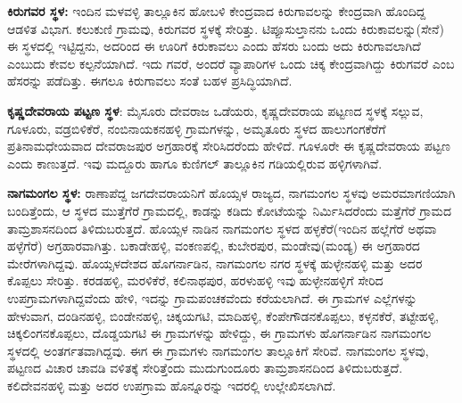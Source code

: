 \textbf{ಕಿರುಗವರ ಸ್ಥಳ:} ಇಂದಿನ ಮಳವಳ್ಳಿ ತಾಲ್ಲೂಕಿನ ಹೋಬಳಿ ಕೇಂದ್ರವಾದ ಕಿರುಗಾವಲನ್ನು ಕೇಂದ್ರವಾಗಿ ಹೊಂದಿದ್ದ ಆಡಳಿತ ವಿಭಾಗ. ಕಲುಕುಣಿ ಗ್ರಾಮವು, ಕಿರುಗವರ ಸ್ಥಳಕ್ಕೆ ಸೇರಿತ್ತು. ಟಿಪ್ಪೂಸುಲ್ತಾನನು ಒಂದು ಕಿರುಕಾವಲನ್ನು(ಸೇನೆ) ಈ ಸ್ಥಳದಲ್ಲಿ ಇಟ್ಟಿದ್ದನು, ಅದರಿಂದ ಈ ಊರಿಗೆ ಕಿರುಕಾವಲು ಎಂದು ಹೆಸರು ಬಂದು ಅದು ಕಿರುಗಾವಲಾಗಿದೆ ಎಂಬುದು ಕೇವಲ ಕಲ್ಪನೆಯಾಗಿದೆ. ಇದು ಗವರೆ, ಅಂದರೆ ವ್ಯಾಪಾರಿಗಳ ಒಂದು ಚಿಕ್ಕ ಕೇಂದ್ರವಾಗಿದ್ದು ಕಿರುಗವರೆ ಎಂಬ ಹೆಸರನ್ನು ಪಡೆದಿತ್ತು. ಈಗಲೂ ಕಿರುಗಾವಲು ಸಂತೆ ಬಹಳ ಪ್ರಸಿದ್ಧಿಯಾಗಿದೆ.

\textbf{ಕೃಷ್ಣದೇವರಾಯ ಪಟ್ಟಣ ಸ್ಥಳ}: ಮೈಸೂರು ದೇವರಾಜ ಒಡೆಯರು, ಕೃಷ್ಣದೇವರಾಯ ಪಟ್ಟಣದ ಸ್ಥಳಕ್ಕೆ ಸಲ್ಲುವ, ಗೂಳೂರು, ವಡ್ರಬಿಳಿಕೆರೆ, ನಂಬಿನಾಯಕನಹಳ್ಳಿ ಗ್ರಾಮಗಳನ್ನು, ಅಮೃತೂರು ಸ್ಥಳದ ಹಾಲುಗಂಗಕೆರೆಗೆ ಪ್ರತಿನಾಮಧೇಯವಾದ ದೇವರಾಜಪುರ ಅಗ್ರಹಾರಕ್ಕೆ ಸೇರಿಸಿದರೆಂದು ಹೇಳಿದೆ. ಗೂಳೂರೇ ಈ ಕೃಷ್ಣದೇವರಾಯ ಪಟ್ಟಣ ಎಂದು ಕಾಣುತ್ತದೆ. ಇವು ಮದ್ದೂರು ಹಾಗೂ ಕುಣಿಗಲ್​ ತಾಲ್ಲೂಕಿನ ಗಡಿಯಲ್ಲಿರುವ ಹಳ್ಳಿಗಳಾಗಿವೆ.

\textbf{ನಾಗಮಂಗಲ ಸ್ಥಳ:} ರಾಣಾಪೆದ್ದ ಜಗದೇವರಾಯನಿಗೆ ಹೊಯ್ಸಳ ರಾಜ್ಯದ, ನಾಗಮಂಗಲ ಸ್ಥಳವು ಅಮರಮಾಗಣಿ\-ಯಾಗಿ ಬಂದಿತ್ತೆಂದು, ಆ ಸ್ಥಳದ ಮುತ್ತೆಗೆರೆ ಗ್ರಾಮದಲ್ಲಿ, ಕಾಡನ್ನು ಕಡಿದು ಕೋಟೆಯನ್ನು ನಿರ್ಮಿಸಿದರೆಂದು ಮತ್ತೆಗೆರೆ ಗ್ರಾಮದ ತಾಮ್ರಶಾಸನದಿಂದ ತಿಳಿದುಬರುತ್ತದೆ. ಹೊಯ್ಸಳ ನಾಡಿನ ನಾಗಮಂಗಲ ಸ್ಥಳದ ಹಳ್ಳಕೆರೆ(ಇಂದಿನ ಹಲ್ಲೆಗೆರೆ ಅಥವಾ ಹಳ್ಳೆಗೆರೆ) ಅಗ್ರಹಾರವಾಗಿತ್ತು. ಬಕಾಡೇಹಳ್ಳಿ, ವಂಕಣಪಲ್ಲಿ, ಕುಬೇರಪುರ, ಮಂಡೇವು(ಮಂಡ್ಯ) ಈ ಅಗ್ರಹಾರದ ಮೇರೆಗಳಾಗಿದ್ದವು. ಹೊಯ್ಸಳದೇಶದ ಹೊಗರ್ನಾಡಿನ, ನಾಗಮಂಗಲ ನಗರ ಸ್ಥಳಕ್ಕೆ ಹುಳ್ಳೇನಹಳ್ಳಿ ಮತ್ತು ಅದರ ಕೊಪ್ಪಲು ಸೇರಿತ್ತು. ಕರಡಹಳ್ಳಿ, ಮರಳಿಕೆರೆ, ಕಲಿನಾಥಪುರ, ಹರಳುಹಳ್ಳಿ ಇವು ಹುಳ್ಳೇನಹಳ್ಳಿಗೆ ಸೇರಿದ ಉಪಗ್ರಾಮಗಳಾಗಿದ್ದವೆಂದು ಹೇಳಿ, ಇದನ್ನು ಗ್ರಾಮಪಂಚಕವೆಂದು ಕರೆಯಲಾಗಿದೆ. ಈ ಗ್ರಾಮಗಳ ಎಲ್ಲೆಗಳನ್ನು ಹೇಳುವಾಗ, ದಂಡಿನಹಳ್ಳಿ, ಬಿಂಡೇನಹಳ್ಳಿ, ಚಿಕ್ಕಯಗಟಿ, ಮಾದಿಹಳ್ಳಿ, ಕೆಂಪೇಗೌಡನಕೊಪ್ಪಲು, ಕಳ್ಳನಕೆರೆ, ತಟ್ಟೇಹಳ್ಳಿ, ಚಿಕ್ಕಲಿಂಗನಕೊಪ್ಪಲು, ದೊಡ್ಡಯಗಟಿ ಈ ಗ್ರಾಮಗಳನ್ನು ಹೇಳಿದ್ದು, ಈ ಗ್ರಾಮಗಳು ಹೊಗರ್ನಾಡಿನ ನಾಗಮಂಗಲ ಸ್ಥಳದಲ್ಲಿ ಅಂತರ್ಗತವಾಗಿದ್ದವು. ಈಗ ಈ ಗ್ರಾಮಗಳು ನಾಗಮಂಗಲ ತಾಲ್ಲೂಕಿಗೆ ಸೇರಿವೆ. ನಾಗಮಂಗಲ ಸ್ಥಳವು, ಪಟ್ಟಣದ ವಿಚಾರ ಚಾವಡಿ ವಳಿತಕ್ಕೆ ಸೇರಿತ್ತೆಂದು ಮುದುಗುಂದೂರು ತಾಮ್ರಶಾಸನದಿಂದ ತಿಳಿದುಬರುತ್ತದೆ. ಕಲಿದೇವನಹಳ್ಳಿ ಮತ್ತು ಅದರ ಉಪಗ್ರಾಮ ಹೊನ್ನೂರನ್ನು ಇದರಲ್ಲಿ ಉಲ್ಲೇಖಿಸಲಾಗಿದೆ.


